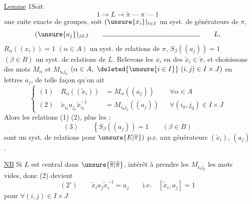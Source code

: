 \uline{Lemme} 1\qquad Soit
\[1\longrightarrow L\longrightarrow\widetilde\pi\;\text{---}\;\pi\;\text{---}\;1\]
une suite exacte de groupes, soit $(\unsure{x_i})_{i\in I}$ un syst. de générateurs de $\pi$,
\[(\unsure{a_j})_{j\in J}\qquad\text{\rule{5cm}{.4pt}}\qquad L,\]
$R_\alpha((x_i))=1$ $(\alpha\in A)$ un syst. de relations  de $\pi$, $S_\beta((a_j))=1$ $(\beta\in B)$ un syst. de relations  de $L$. Relevons les $x_i$ en des $\widetilde x_i\in\widetilde\pi$, et choisissons des mots $M_\alpha$ et $M_{i_0j_0}$ $(\alpha\in A,\ \deleted{\unsure{i\in I}}\ (i,j)\in I\times J)$ en  lettres $a_j$, de telle façon qu'on ait
\[
\left\{\begin{aligned}
(1)\quad R_\alpha((\widetilde x_i))&=M_\alpha((a_j))&&\forall\alpha\in A\\
(2)\quad\widetilde x_{i_0}a_{j_0}\widetilde x_{i_0}^{-1}&=M_{i_0j_0}((a_j))&&\forall(i_0,j_0)\in I\times J
\end{aligned}\right.
\]
Alors les relations (1) (2), plus les :
\[(3)\qquad\left\{S_\beta((a_j))=1\qquad(\beta\in B)\right.\]
sont un syst. de relations  pour $\unsure{E|\widetilde\pi})$ p.r. aux générateurs $(\widetilde x_i)$, $(a_j)$.

\uline{NB} Si $L$ est central dans $\unsure{\widehat\pi|\widetilde\pi}$,  intérêt à prendre les $M_{i_0j_0}$ les mots vides, donc (2) devient
\[(2')\qquad\widetilde x_i a_j\widetilde x_i^{-1}=a_j\qquad\text{i.e.}\quad[\widetilde x_i,a_j]=1\]
pour $\forall(i,j)\in I\times J$

